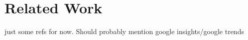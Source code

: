 \section{Related Work}
just some refs for now.
\cite{dakka2008automatic}
\cite{wanner2009visual}
\cite{grobelnik2004visualization}
\cite{collins2006wordnet}
\cite{collins2009docuburst}
\cite{wermter2002selforganizing}
\cite{johnson2004network}
\cite{hearst1995tilebars}
\cite{mehler2006spatial}
\cite{paulovich2006text}
Should probably mention google insights/google trends